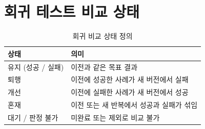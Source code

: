 \section{회귀 테스트 비교 상태}
\begin{table}[H]
\centering\small
\caption{회귀 비교 상태 정의}
\begin{tabularx}{\linewidth}{@{}p{52mm}Y@{}}
\toprule
상태 & 의미 \\
\midrule
유지 (성공 / 실패) & 이전과 같은 목표 결과 \\
퇴행 & 이전에 성공한 사례가 새 버전에서 실패 \\
개선 & 이전에 실패한 사례가 새 버전에서 성공 \\
혼재 & 이전 또는 새 반복에서 성공과 실패가 섞임 \\
대기 / 판정 불가 & 미완료 또는 제외로 비교 불가 \\
\bottomrule
\end{tabularx}
\end{table}

